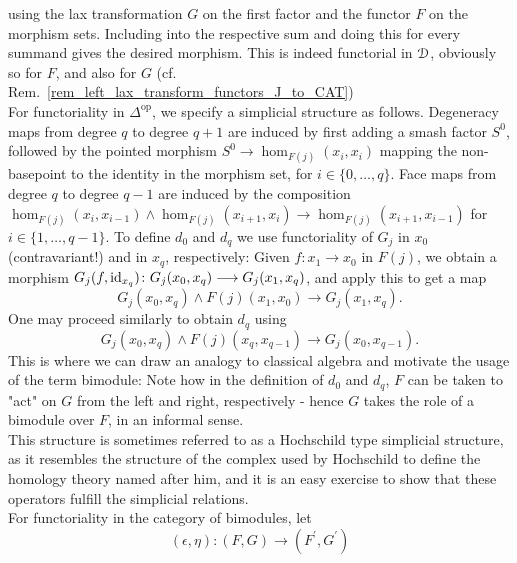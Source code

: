 \begin{defn}
      using the lax transformation $G$ on the first factor and the functor $F$
      on the morphism sets.
      Including into the respective sum and doing this for every summand gives
      the desired morphism. This is indeed functorial in $\mathcal{D}$, obviously so for
      $F$, and also for $G$ (cf.
      Rem.~\ref{rem_left_lax_transform_functors_J_to_CAT})\\
      For functoriality in $\Delta^{\mathrm{op}}$, we specify a simplicial
      structure as follows.
      Degeneracy maps from degree $q$ to degree $q+1$ are induced by first
      adding a smash factor $S^0$, followed by the pointed morphism $S^0 \to
      \hom_{F(j)}(x_i,x_i)$ mapping the non-basepoint to the identity in the
      morphism set, for $i \in \{ 0, \ldots, q \}$.  Face maps from degree $q$
      to degree $q-1$ are induced by the composition $\hom_{F(j)}(x_i,x_{i-1})
      \wedge \hom_{F(j)}(x_{i+1},x_i) \to \hom_{F(j)}(x_{i+1},x_{i-1})$ for $i
      \in \{ 1, \ldots, q-1 \}$.  To define $d_0$ and $d_q$ we use functoriality
      of $G_j$ in $x_0$ (contravariant!) and in $x_q$, respectively: Given $f:
      x_1 \to x_0$ in $F(j)$, we obtain a morphism $G_j(f,\operatorname{id}_{x_q}) \colon
      G_j(x_0,x_q) \longrightarrow G_j(x_1,x_q)$, and apply this to get a map
      \begin{displaymath}
        G_j(x_0,x_q) \wedge F(j)(x_1,x_0) \to G_j(x_1,x_q).
      \end{displaymath}
      One may proceed similarly to obtain $d_q$ using
      \begin{displaymath}
        G_j(x_0,x_q) \wedge F(j)(x_q,x_{q-1}) \to G_j(x_0,x_{q-1}).
      \end{displaymath}
      This is where we can draw an analogy to classical algebra and motivate the
      usage of the term bimodule: Note how in the definition of $d_0$ and $d_q$,
      $F$ can be taken to "act" on $G$ from the left and right, respectively -
      hence $G$ takes the role of a bimodule over $F$, in an informal sense.\\
      This structure is sometimes referred to as a Hochschild type simplicial
      structure, as it resembles the structure of the complex used by Hochschild
      to define the homology theory named after him, and it is an easy exercise
      to show that these operators fulfill the simplicial relations.\\
      For functoriality in the category of bimodules, let
      \begin{displaymath}
        (\epsilon, \eta) \colon (F,G) \to (F^\prime, G^\prime)

\end{displaymath}
\end{defn}

